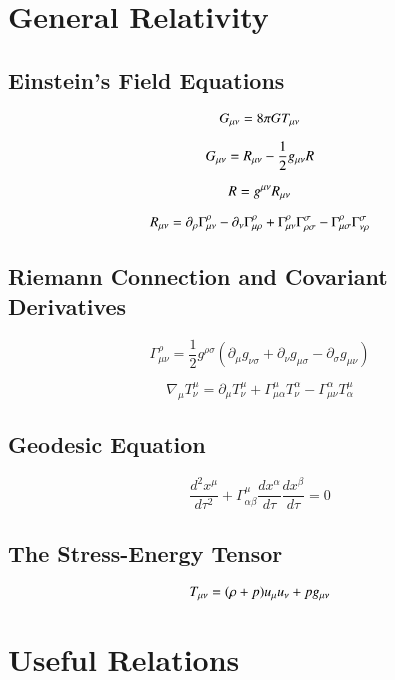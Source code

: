 %
%


\section{General Relativity}

\subsection{Einstein's Field Equations}

\begin{equation}
    G_{\mu\nu} = 8\pi G T_{\mu\nu}
\end{equation}


\begin{equation}
    G_{\mu\nu} = R_{\mu\nu} - \frac{1}{2} g_{\mu\nu} R
\end{equation}

\begin{equation}
    R = g^{\mu\nu} R_{\mu\nu}
\end{equation}

\begin{equation}
    R_{\mu\nu} = \partial_\rho \Gamma^\rho_{\mu\nu} - \partial_\nu \Gamma^\rho_{\mu\rho} + \Gamma^\rho_{\mu\nu} \Gamma^\sigma_{\rho\sigma} - \Gamma^\rho_{\mu\sigma} \Gamma^\sigma_{\nu\rho}
\end{equation}


\subsection{Riemann Connection and Covariant Derivatives}

\begin{equation}
    \Gamma^\rho_{\mu\nu} = \frac{1}{2} g^{\rho\sigma} \left( \partial_\mu g_{\nu\sigma} + \partial_\nu g_{\mu\sigma} - \partial_\sigma g_{\mu\nu} \right)
\end{equation}

\begin{equation}
    \nabla_\mu T^\mu_\nu = \partial_\mu T^\mu_\nu + \Gamma^\mu_{\mu\alpha} T^\alpha_\nu - \Gamma^\alpha_{\mu\nu} T^\mu_\alpha
\end{equation}

\subsection{Geodesic Equation}

\begin{equation}
    \frac{d^2 x^\mu}{d\tau^2} + \Gamma^\mu_{\alpha\beta} \frac{dx^\alpha}{d\tau} \frac{dx^\beta}{d\tau} = 0
\end{equation}

\subsection{The Stress-Energy Tensor}

\begin{equation}
    T_{\mu\nu} = (\rho + p) u_\mu u_\nu + p g_{\mu\nu}
\end{equation}

\section{Useful Relations}